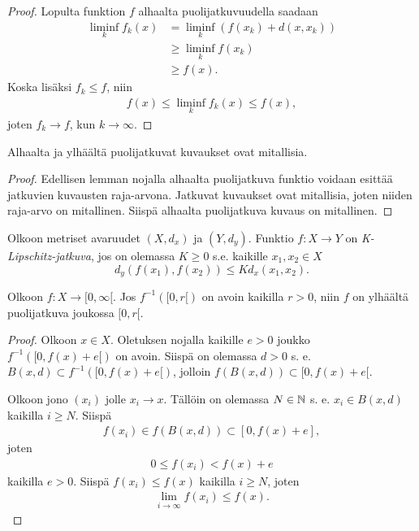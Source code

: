 \documentclass[12pt,oneside,a4paper]{amsbook} %
\begin{document}
\begin{proof}
    Lopulta funktion $f$ alhaalta puolijatkuvuudella saadaan
    \begin{align*}
        \liminf_k f_k(x) &= \liminf_k (f(x_k) + d(x,x_k)) \\
        &\ge \liminf_k f(x_k) \\
        & \ge f(x).
    \end{align*}
    Koska lisäksi $f_k \le f$, niin
    \begin{align*}
        f(x) \le \liminf_k f_k(x) \le f(x),
    \end{align*}
    joten $f_k \to f$, kun $k \to \infty$.
\end{proof}

\begin{corollary}\label{co:LSCimpliesMeasurable}
    Alhaalta ja ylhäältä puolijatkuvat kuvaukset ovat mitallisia.
\end{corollary}
\begin{proof}
    Edellisen lemman nojalla alhaalta puolijatkuva funktio voidaan esittää jatkuvien kuvausten raja-arvona. Jatkuvat kuvaukset ovat mitallisia, joten niiden raja-arvo on mitallinen. Siispä alhaalta puolijatkuva kuvaus on mitallinen. 
\end{proof}

\begin{definition}
    Olkoon metriset avaruudet $(X, d_x)$ ja $(Y, d_y)$. Funktio $f:X\to Y$ on \textit{K-Lipschitz-jatkuva}, jos on olemassa $K\ge 0$ s.e. kaikille $x_1,x_2 \in X$
    $$d_y(f(x_1),f(x_2)) \le Kd_x(x_1,x_2).$$
\end{definition}

\begin{lemma}\label{le:openPreimageImpliesUSC}
    Olkoon $f:X \to [0, \infty[$. Jos $f^{-1}([0, r[)$ on avoin kaikilla $r > 0$, niin $f$ on ylhäältä puolijatkuva joukossa $[0, r[$.
\end{lemma}
\begin{proof}
    Olkoon $x \in X$. Oletuksen nojalla kaikille $e > 0$ joukko $f^{-1}([0, f(x) + e[)$ on avoin. Siispä on olemassa $d > 0$ s. e. $B(x, d) \subset f^{-1}([0, f(x) + e[)$, jolloin $f(B(x,d)) \subset [0, f(x) + e[$.
    
    Olkoon jono $(x_i)$ jolle $x_i \to x$. Tällöin on olemassa $N \in \mathbb{N}$ s. e. $x_i \in B(x, d)$ kaikilla $i \ge N$. Siispä
    \begin{align*}
        f(x_i) \in f(B(x, d)) \subset [0, f(x) + e],
    \end{align*}
    joten
    \begin{align*}
        0 \le f(x_i) < f(x) + e
    \end{align*}
    kaikilla $e > 0$. Siispä $f(x_i) \le f(x)$ kaikilla $i \ge N$, joten
    \begin{align*}
        \lim_{i\to \infty}f(x_i) \le f(x).
    \end{align*}
\end{proof}
\end{document}

